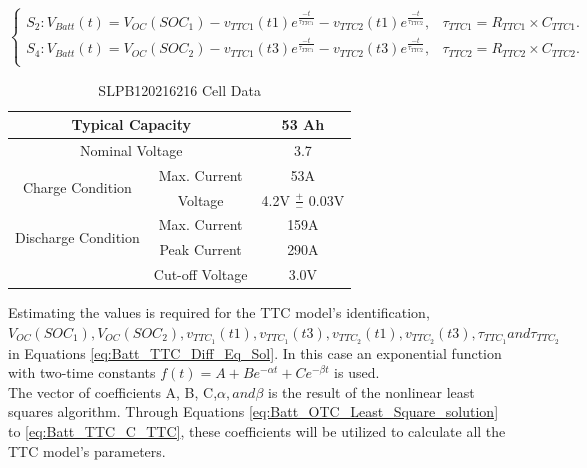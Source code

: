 \begin{equation}\label{eq:Batt_TTC_Diff_Eq_Sol}
	\begin{cases}
	  S_2 : V_{Batt}(t) = V_{OC}(SOC_1) - v_{TTC1}(t1) e^{\frac{-t}{\tau_{TTC1}}} - v_{TTC2}(t1) e^{\frac{-t}{\tau_{TTC2}}},&\tau_{TTC1} = R_{TTC1}\times C_{TTC1}.\\
	  S_4 : V_{Batt}(t) = V_{OC}(SOC_2) - v_{TTC1}(t3) e^{\frac{-t}{\tau_{TTC1}}} - v_{TTC2}(t3) e^{\frac{-t}{\tau_{TTC2}}},&\tau_{TTC2} = R_{TTC2}\times C_{TTC2}. \\
	\end{cases}
\end{equation}


\begin{table}[ht]\label{tb:SLPB120216216_Cell_Data }
	\begin{center}
		\begin{tabular}{|c|c|c|}
			\hline
			\multicolumn{2}{|c|}{{Typical Capacity }} & 53 Ah\\
			\hline
			\multicolumn{2}{|c|}{{Nominal Voltage}} & 3.7\\
			\hline
			\multicolumn{1}{|c|}{\multirow{2}{*}{Charge Condition}}& Max. Current & 53A\\ 
			\multicolumn{1}{|c|}{}& Voltage & 4.2V $\frac{+}{-}$ 0.03V\\
			\hline
			\multicolumn{1}{|c|}{\multirow{2}{*}{Discharge Condition}}& Max. Current & 159A\\
			\multicolumn{1}{|c|}{}& Peak Current & 290A\\
			\multicolumn{1}{|c|}{}& Cut-off Voltage & 3.0V\\
			\hline
		\end{tabular}
		\caption{SLPB120216216 Cell Data }
	\end{center}
	\label{tab:multicol}
\end{table}

Estimating the values is required for the TTC model's identification, $V_{OC}(SOC_1), V_{OC}(SOC_2), v_{TTC_1}(t1), v_{TTC_1}(t3), v_{TTC_2}(t1), 
v_{TTC_2}(t3), \tau_{TTC_1}  and  \tau_{TTC_2}$ in Equations \ref{eq:Batt_TTC_Diff_Eq_Sol}. In this 
case an exponential function with two-time constants $f(t)=A+Be^{-\alpha t}+Ce^{- \beta t}$ is used.
\\
The vector of coefficients A, B, C,$\alpha, and \beta$ is the result of the nonlinear least squares algorithm. Through Equations \ref{eq:Batt_OTC_Least_Square_solution} to \ref{eq:Batt_TTC_C_TTC}, these coefficients will be utilized to calculate all the TTC model's parameters. 

